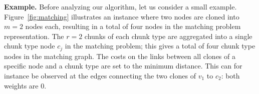 \documentclass[9pt]{sigcomm-alternate}
\newcommand{\MaFactor}{m}
\newcommand{\RedundancyFactor}{\ensuremath{r}}
\newcommand{\VmChunkAssignment}{\mu}
\newcommand{\NodeMapping}{\pi}
\newcommand{\VirtualNode}{v}
\newcommand{\achunk}{\ensuremath{c}}
\newcommand{\RS}{\textsc{RS}}
\newcommand{\MA}{\textsc{MA}}
\begin{document}
\textbf{Example.} Before analyzing our algorithm, let us consider a small example.
%
%
%
Figure~\ref{fig:matching} illustrates
an instance where two nodes are
cloned into $\MaFactor = 2$ nodes each, resulting in a total of four nodes in
the matching problem representation.
The $\RedundancyFactor = 2$ chunks of each chunk type are
aggregated into a single chunk type node $\achunk_j$  in the matching problem;
this gives a total of four chunk type nodes in the matching graph. The costs
on the links between all clones of a specific node and a chunk type are set to
the minimum distance. This can for instance be observed at the edges connecting
the two clones of $\VirtualNode_1$ to $\achunk_2$: both weights are 0.
\end{document}
